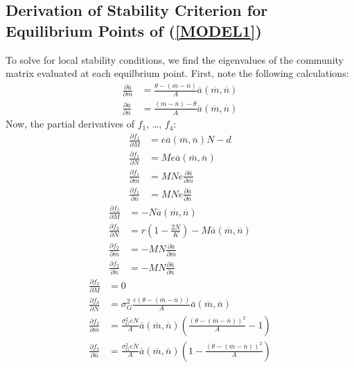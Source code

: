 \documentclass{amsart}
\theoremstyle{definition}
\theoremstyle{remark}
\numberwithin{equation}{section}
\begin{document}
\subsection*{Derivation of Stability Criterion for Equilibrium Points of (\ref{MODEL1})}
To solve for local stability conditions, we find the eigenvalues of the community matrix evaluated at each equilbrium point.  First, note the following calculations:
\begin{align*}
	\frac{\partial \overline{a}}{\partial \overline{m}} &= \frac{\theta - (\overline{m} - \overline{n})}{A}\overline{a}(\overline{m}, \overline{n}) \\[5px]
	\frac{\partial \overline{a}}{\partial \overline{n}} &= \frac{(\overline{m} - \overline{n}) - \theta}{A}\overline{a}(\overline{m}, \overline{n})
\end{align*}
Now, the partial derivatives of $f_1$, \dots, $f_4$:
\begin{align*}
	\frac{\partial f_1}{\partial M} &= e\overline{a}(\overline{m}, \overline{n})N - d\\[5px]
	\frac{\partial f_1}{\partial N} &= Me\overline{a}(\overline{m}, \overline{n})\\[5px]
	\frac{\partial f_1}{\partial \overline{m}} &= MNe\frac{\partial \overline{a}}{\partial \overline{m}} \\[5px]
	\frac{\partial f_1}{\partial \overline{n}} &= MNe\frac{\partial \overline{a}}{\partial \overline{n}}
\end{align*}
\begin{align*}
	\frac{\partial f_2}{\partial M} &= -N\overline{a}(\overline{m}, \overline{n}) \\[5px]
	\frac{\partial f_2}{\partial N} &= r\left(1 - \frac{2N}{K}\right) - M\overline{a}(\overline{m}, \overline{n})\\[5px]
	\frac{\partial f_2}{\partial \overline{m}} &= -MN\frac{\partial \overline{a}}{\partial \overline{m}} \\[5px]
	\frac{\partial f_2}{\partial \overline{n}} &= -MN\frac{\partial \overline{a}}{\partial \overline{n}}
\end{align*}
\begin{align*}
	\frac{\partial f_3}{\partial M} &= 0 \\[5px]
	\frac{\partial f_3}{\partial N} &= \sigma_{G}^2\frac{e(\theta - (\overline{m} - \overline{n}))}{A}\overline{a}(\overline{m}, \overline{n}) \\[5px]
	\frac{\partial f_3}{\partial \overline{m}} &= \frac{\sigma_G^2eN}{A}\overline{a}(\overline{m}, \overline{n})\left(\frac{(\theta - (\overline{m} - \overline{n}))^2}{A} - 1\right)\\[5px]
	\frac{\partial f_3}{\partial \overline{n}} &= \frac{\sigma_G^2eN}{A}\overline{a}(\overline{m}, \overline{n})\left(1 - \frac{(\theta - (\overline{m} - \overline{n}))^2}{A}\right)
\end{align*}
\end{document}
